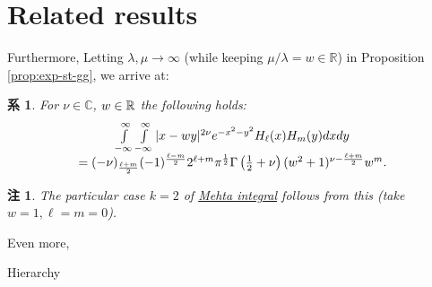 \documentclass[pdf,notes]{beamer}
\newtheorem{remark}{注}
\newtheorem{cor}{系}
\begin{document}
\section{Related results}
\begin{frame}
	Furthermore,
	Letting $\lambda,\mu\to\infty$ (while keeping $\mu/\lambda=w\in\mathbb{R}$) in Proposition \ref{prop:exp-st-gg}, we arrive at:
	\begin{cor}\label{cor:int-xzy-hh}
		For $\nu\in\mathbb{C}$, $w\in\R$ the following holds:
		\begin{equation*}
			\begin{array}[]{c}
			\int_{- \infty}^{\infty} \int_{- \infty}^{\infty} | x - w y |^{2 \nu} e^{-
			x^2 - y^2} H_\ell (x) H_m (y) d x d y \\= (- \nu)_{\frac{\ell + m}{2}} (- 1)^{\frac{\ell
			- m}{2}} 2^{\ell + m} \pi^{\frac{1}{2}} \Gamma \left( \frac{1}{2} + \nu \right)
			(w^2 + 1)^{\nu - \frac{\ell + m}{2}} w^m .
			\end{array}
		\end{equation*}
	\end{cor}
	\begin{remark}
		The particular case $k=2$ of \underline{Mehta integral} follows from this (take $w=1,\ell=m=0$).
	\end{remark}
	Even more,
\end{frame}
\begin{frame}[fragile]{Hierarchy}
\begin{tikzpicture}

\end{tikzpicture}
\end{frame}
\end{document}
